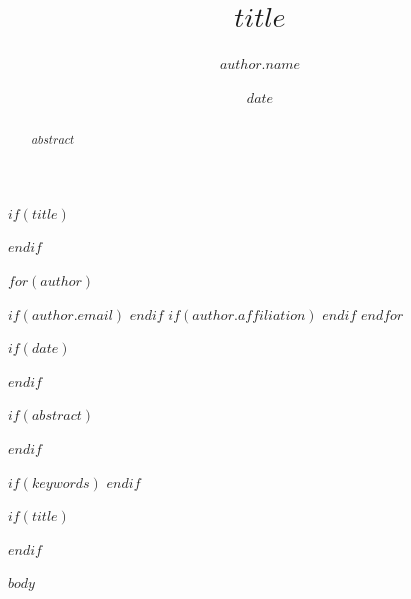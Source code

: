 \documentclass[aps,prl,reprint,superscriptaddress,amsmath,amssymb,floatfix]{revtex4-2}
\begin{document}
$if(title)$
\title{$title$}
$endif$

$for(author)$
\author{$author.name$}
$if(author.email)$
$endif$
$if(author.affiliation)$
$endif$
$endfor$

$if(date)$
\date{$date$}
$endif$

$if(abstract)$
\begin{abstract}
$abstract$
\end{abstract}
$endif$

$if(keywords)$
$endif$

$if(title)$
\maketitle
$endif$

$body$



\end{document}
